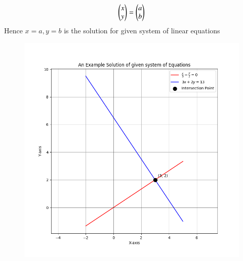 \documentclass[journal]{IEEEtran}
\begin{document}
  \begin{align}
      \begin{pmatrix}x\\y\end{pmatrix}=\begin{pmatrix}a\\b\end{pmatrix}
  \end{align}
Hence $x=a,y=b$ is the solution for given system of linear equations
\begin{figure}[h!]
   \centering
   \includegraphics[width=0.7\columnwidth]{figs/fig1.png}
   \caption{}
   \label{Figure}
\end{figure}
\end{document}
